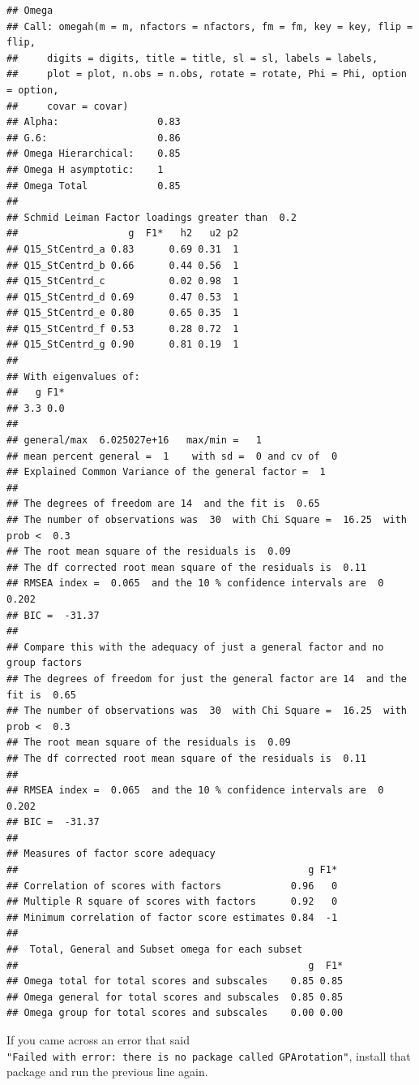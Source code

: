 \documentclass[
]{article}
\begin{document}
\begin{verbatim}
## Omega 
## Call: omegah(m = m, nfactors = nfactors, fm = fm, key = key, flip = flip, 
##     digits = digits, title = title, sl = sl, labels = labels, 
##     plot = plot, n.obs = n.obs, rotate = rotate, Phi = Phi, option = option, 
##     covar = covar)
## Alpha:                 0.83 
## G.6:                   0.86 
## Omega Hierarchical:    0.85 
## Omega H asymptotic:    1 
## Omega Total            0.85 
## 
## Schmid Leiman Factor loadings greater than  0.2 
##                   g  F1*   h2   u2 p2
## Q15_StCentrd_a 0.83      0.69 0.31  1
## Q15_StCentrd_b 0.66      0.44 0.56  1
## Q15_StCentrd_c           0.02 0.98  1
## Q15_StCentrd_d 0.69      0.47 0.53  1
## Q15_StCentrd_e 0.80      0.65 0.35  1
## Q15_StCentrd_f 0.53      0.28 0.72  1
## Q15_StCentrd_g 0.90      0.81 0.19  1
## 
## With eigenvalues of:
##   g F1* 
## 3.3 0.0 
## 
## general/max  6.025027e+16   max/min =   1
## mean percent general =  1    with sd =  0 and cv of  0 
## Explained Common Variance of the general factor =  1 
## 
## The degrees of freedom are 14  and the fit is  0.65 
## The number of observations was  30  with Chi Square =  16.25  with prob <  0.3
## The root mean square of the residuals is  0.09 
## The df corrected root mean square of the residuals is  0.11
## RMSEA index =  0.065  and the 10 % confidence intervals are  0 0.202
## BIC =  -31.37
## 
## Compare this with the adequacy of just a general factor and no group factors
## The degrees of freedom for just the general factor are 14  and the fit is  0.65 
## The number of observations was  30  with Chi Square =  16.25  with prob <  0.3
## The root mean square of the residuals is  0.09 
## The df corrected root mean square of the residuals is  0.11 
## 
## RMSEA index =  0.065  and the 10 % confidence intervals are  0 0.202
## BIC =  -31.37 
## 
## Measures of factor score adequacy             
##                                                  g F1*
## Correlation of scores with factors            0.96   0
## Multiple R square of scores with factors      0.92   0
## Minimum correlation of factor score estimates 0.84  -1
## 
##  Total, General and Subset omega for each subset
##                                                  g  F1*
## Omega total for total scores and subscales    0.85 0.85
## Omega general for total scores and subscales  0.85 0.85
## Omega group for total scores and subscales    0.00 0.00
\end{verbatim}

If you came across an error that said \texttt{"Failed\ with\ error:\ \textquotesingle{}there\ is\ no\ package\ called\ \textquotesingle{}GPArotation\textquotesingle{}\textquotesingle{}"}, install that package
and run the previous line again.
\end{document}

